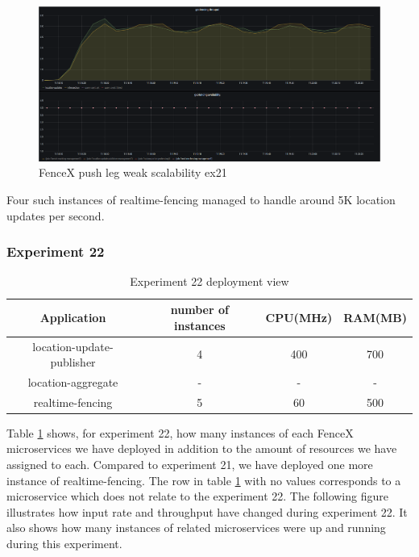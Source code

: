 \documentclass[a4]{report}
\begin{document}
    \begin{figure}
        \caption{FenceX push leg weak scalability ex21}
        \label{fig:ex21}
        \includegraphics[scale=0.5]{images/evaluation/ex21-benchmarking-ongoing-1per6sec.png}
    \end{figure}
    Four such instances of realtime-fencing managed to handle around 5K location updates per second.

    \clearpage

    \subsubsection{Experiment 22}
    \begin{table}[h!]
        \centering
        \begin{tabular}{|c|c|c|c|}
            \hline
            Application               & number of instances & CPU(MHz) & RAM(MB) \\
            \hline
            location-update-publisher & 4                   & 400      & 700     \\
            location-aggregate        & -                   & -        & -       \\
            realtime-fencing          & 5                   & 60       & 500     \\
            \hline
        \end{tabular}
        \caption{Experiment 22 deployment view}
        \label{table:ex22-dv}
    \end{table}

    Table \ref{table:ex22-dv} shows, for experiment 22, how many instances of each FenceX microservices we have
    deployed in addition to the amount of resources we have assigned to each.
    Compared to experiment 21, we have deployed one more instance of realtime-fencing.
    The row in table \ref{table:ex22-dv} with no values corresponds to a microservice which does not relate to the
    experiment 22.
    The following figure illustrates how input rate and throughput have changed during experiment 22.
    It also shows how many instances of related microservices were up and running during this experiment.
\end{document}
